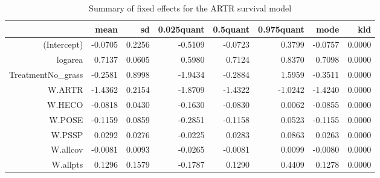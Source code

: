 \begin{table}[ht]
\centering
\caption{Summary of fixed effects for the ARTR survival model} 
\label{ARTRsurvival}
\begin{tabular}{rrrrrrrr}
  \hline
 & mean & sd & 0.025quant & 0.5quant & 0.975quant & mode & kld \\ 
  \hline
(Intercept) & -0.0705 & 0.2256 & -0.5109 & -0.0723 & 0.3799 & -0.0757 & 0.0000 \\ 
  logarea & 0.7137 & 0.0605 & 0.5980 & 0.7124 & 0.8370 & 0.7098 & 0.0000 \\ 
  TreatmentNo\_grass & -0.2581 & 0.8998 & -1.9434 & -0.2884 & 1.5959 & -0.3511 & 0.0000 \\ 
  W.ARTR & -1.4362 & 0.2154 & -1.8709 & -1.4322 & -1.0242 & -1.4240 & 0.0000 \\ 
  W.HECO & -0.0818 & 0.0430 & -0.1630 & -0.0830 & 0.0062 & -0.0855 & 0.0000 \\ 
  W.POSE & -0.1159 & 0.0859 & -0.2851 & -0.1158 & 0.0523 & -0.1155 & 0.0000 \\ 
  W.PSSP & 0.0292 & 0.0276 & -0.0225 & 0.0283 & 0.0863 & 0.0263 & 0.0000 \\ 
  W.allcov & -0.0081 & 0.0093 & -0.0265 & -0.0081 & 0.0099 & -0.0080 & 0.0000 \\ 
  W.allpts & 0.1296 & 0.1579 & -0.1787 & 0.1290 & 0.4409 & 0.1278 & 0.0000 \\ 
   \hline
\end{tabular}
\end{table}

